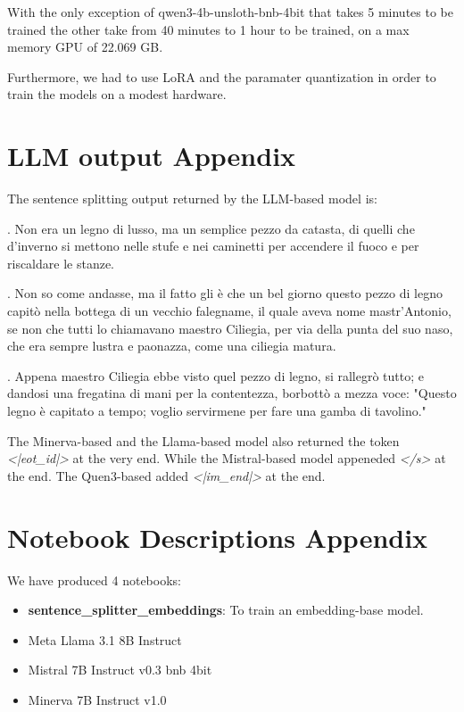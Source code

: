 \documentclass[11pt]{article}
\begin{document}
With the only exception of qwen3-4b-unsloth-bnb-4bit that takes 5 minutes
to be trained the other take from 40 minutes to 1 hour to be trained,
on a max memory GPU of 22.069 GB.

Furthermore,
we had to use LoRA and the paramater quantization in order to train the models
on a modest hardware.

\appendix

\section{LLM output Appendix}
\label{sec:appendix1}

The sentence splitting output returned by the LLM-based model is:

. Non era un legno di lusso, ma un semplice pezzo da catasta, di quelli che d’inverno si mettono nelle stufe e nei caminetti per accendere il fuoco e per riscaldare le stanze.

. Non so come andasse, ma il fatto gli è che un bel giorno questo pezzo di legno capitò nella bottega di un vecchio falegname, il quale aveva nome mastr’Antonio, se non che tutti lo chiamavano maestro Ciliegia, per via della punta del suo naso, che era sempre lustra e paonazza, come una ciliegia matura.

. Appena maestro Ciliegia ebbe visto quel pezzo di legno, si rallegrò tutto; e dandosi una fregatina di mani per la contentezza, borbottò a mezza voce: "Questo legno è capitato a tempo; voglio servirmene per fare una gamba di tavolino."

The Minerva-based and the Llama-based model also returned the token \emph{<|eot\_id|>}
at the very end. While the Mistral-based model appeneded \emph{</s>} at the end.
The Quen3-based added \emph{<|im\_end|>} at the end.

\section{Notebook Descriptions Appendix}
\label{sec:appendix2}

We have produced 4 notebooks:

 \begin{itemize}
	\item \textbf{sentence\_splitter\_embeddings}: To train an embedding-base
	model.
	\item Meta Llama 3.1 8B Instruct
	\item Mistral 7B Instruct v0.3 bnb 4bit
	\item Minerva 7B Instruct v1.0
\end{itemize}
\end{document}
